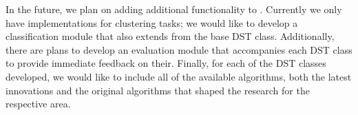 \documentclass[nojss]{jss}
\begin{document}
In the future, we plan on adding additional functionality to . Currently we only have implementations for clustering tasks; we would like to develop a classification module that also extends from the base DST class. Additionally, there are plans to develop an evaluation module that accompanies each DST class to provide immediate feedback on their. Finally, for each of the DST classes developed, we would like to include all of the available algorithms, both the latest innovations and the original algorithms that shaped the research for the respective area.




\end{document}
